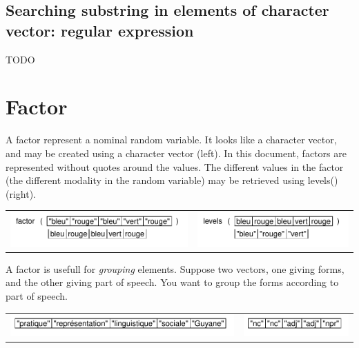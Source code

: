\documentclass[pdflatex]{article}
\begin{document}
\subsection{Searching substring in elements of character vector: regular expression}

TODO

\section{Factor}

A factor represent a nominal random variable. It looks like a character
vector, and may be created using a character vector (left). In this document,
factors are represented without quotes around the values. The different values in
the factor (the different modality in the random variable) may be retrieved
using levels() (right).

\begin{tabular}{cc}
\includegraphics{factor} & \includegraphics{levels}\\
\end{tabular}

A factor is usefull for \emph{grouping} elements. Suppose two vectors, one
giving forms, and the other giving part of speech. You want to group the forms
according to part of speech. 

\begin{tabular}{cc}
\includegraphics{forms1} & \includegraphics{pos1}\\
\end{tabular}
\end{document}
